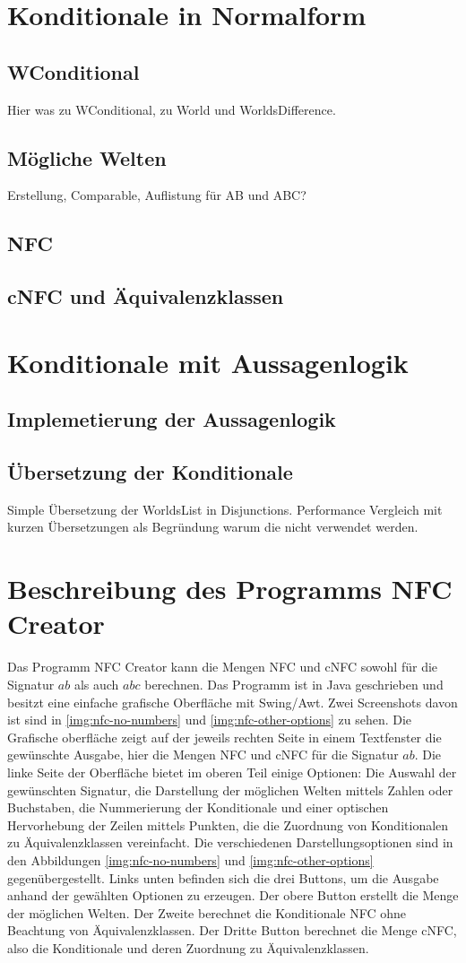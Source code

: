 \documentclass[12pt,a4paper]{article}
\begin{document}
\section{Konditionale in Normalform}
\subsection{WConditional}
Hier was zu WConditional, zu World und WorldsDifference.
\subsection{Mögliche Welten}
Erstellung, Comparable, Auflistung für AB und ABC?
\subsection{NFC}
\subsection{cNFC und Äquivalenzklassen}

\section{Konditionale mit Aussagenlogik}
\subsection{Implemetierung der Aussagenlogik}
\subsection{Übersetzung der Konditionale}
Simple Übersetzung der WorldsList in Disjunctions. Performance Vergleich mit kurzen Übersetzungen als Begründung warum die nicht verwendet werden.
\section{Beschreibung des Programms NFC Creator}
Das Programm NFC Creator kann die Mengen NFC und cNFC sowohl für die Signatur ${ab}$ als auch $abc$ berechnen. Das Programm ist in Java geschrieben und besitzt eine einfache grafische Oberfläche mit Swing/Awt. Zwei Screenshots davon ist sind in \autoref{img:nfc-no-numbers} und  \autoref{img:nfc-other-options} zu sehen. Die Grafische oberfläche zeigt auf der jeweils rechten Seite in einem Textfenster die gewünschte Ausgabe, hier die Mengen NFC und cNFC für die Signatur ${ab}$. Die linke Seite der Oberfläche bietet im oberen Teil einige Optionen: Die Auswahl der gewünschten Signatur, die Darstellung der möglichen Welten mittels Zahlen oder Buchstaben, die Nummerierung der Konditionale und einer optischen Hervorhebung der Zeilen mittels Punkten, die die Zuordnung von Konditionalen zu Äquivalenzklassen vereinfacht. Die verschiedenen Darstellungsoptionen sind in den Abbildungen \ref{img:nfc-no-numbers} und \ref{img:nfc-other-options} gegenübergestellt. Links unten befinden sich die drei Buttons, um die Ausgabe anhand der gewählten Optionen zu erzeugen. Der obere Button erstellt die Menge der möglichen Welten. Der Zweite berechnet die Konditionale NFC ohne Beachtung von Äquivalenzklassen. Der Dritte Button berechnet die Menge cNFC, also die Konditionale und deren Zuordnung zu Äquivalenzklassen.
\end{document}
